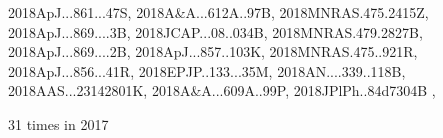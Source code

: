 \documentclass[12pt]{article}
\begin{document}
\begin{description}
{2018ApJ...861...47S,%
2018A&A...612A..97B,%
2018MNRAS.475.2415Z,%
2018ApJ...869....3B,%
2018JCAP...08..034B,%
2018MNRAS.479.2827B,%
2018ApJ...869....2B,%
2018ApJ...857..103K,%
2018MNRAS.475..921R,%
2018ApJ...856...41R,%
2018EPJP..133...35M,%
2018AN....339..118B,%
2018AAS...23142801K,%
2018A&A...609A..99P,%
2018JPlPh..84d7304B%
},\item
31 times in 2017 \citep{
2017ApJ...850L..29B,%
2017A&A...606A..80Y,%
2017MNRAS.472.2569B,%
2017JCAP...12..002K,%
2017APS..DFDD37001A,%
2017ApJ...850....4H,%
2017PhRvE..96e3105R,%
2017ApJ...850L...8S,%
}
\end{description}
\end{document}
